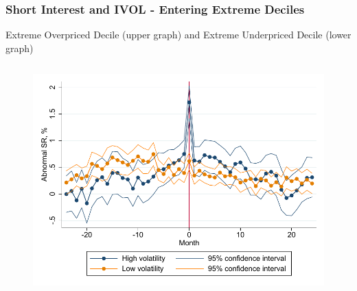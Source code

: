 \documentclass{beamer}
\begin{document}


\begin{frame}[label=ivol_dynamics]
		\frametitle{Short Interest and IVOL - Entering Extreme Deciles\hfill \hyperlink{ivol_results}{}}
		\vspace*{-0.2cm}
{\scriptsize Extreme Overpriced Decile (upper graph) and Extreme Underpriced Decile (lower graph) }
\vspace*{-0.8cm}
		\begin{columns}
 \begin{column}{.5\textwidth}         
\begin{figure}[htbp]
	 \centering
	\includegraphics[scale=0.431]{figures/misp_event_time_sr_dec1.pdf} 
\end{figure}
\vspace*{-2.1cm}
\begin{figure}[htbp]
	 \centering

\end{figure}
\end{column}
\end{columns}
\end{frame}
\end{document}
